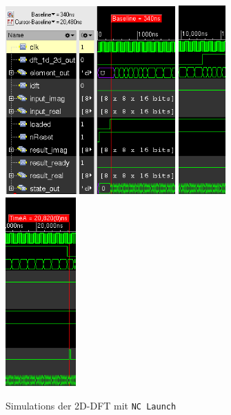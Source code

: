  \begin{figure}[ht]
  \centering
  \includegraphics[width=0.58\textwidth]{img/Simulationsdauer_Anfang.png}
  \hfill
  \includegraphics[width=0.161\textwidth]{img/Simulationsdauer_Mitte.png}
  \hfill
  \includegraphics[width=0.241\textwidth]{img/Simulationsdauer_Ende.png}
  \caption{Simulations der 2D-DFT mit \texttt{NC Launch}}
  \label{pic:Simulationsdauer}
 \end{figure}

